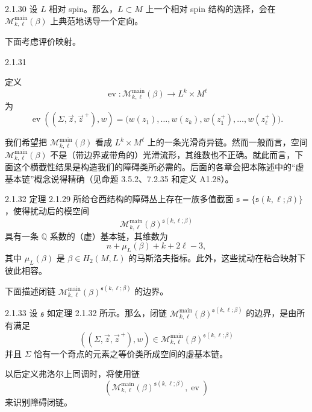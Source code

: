 \begin{theorem}{2.1.30}\label{thm:2-1-30}
设 $L$ 相对 spin。那么，$L\subset M$ 上一个相对 spin 结构的选择，会在
$\mathcal M_{k,\ell}^{\mathrm{main}}(\beta)$ 上典范地诱导一个定向。
\end{theorem}

下面考虑评价映射。

\begin{definition}{2.1.31}\label{def:2-1-31}
\begin{samepage}
定义
\[
  \operatorname{ev}:\mathcal M_{k,\ell}^{\mathrm{main}}(\beta)
  \longrightarrow L^k\times M^\ell
\]
为
\[
  \operatorname{ev}((\Sigma,\vec z,\vec z^{\,+}),w)
  =\bigl(w(z_1),\ldots,w(z_k),
    w(z_1^+),\ldots,w(z_\ell^+)\bigr).
\]
\end{samepage}
\end{definition}

我们希望把 $\mathcal M_{k,\ell}^{\mathrm{main}}(\beta)$ 看成
$L^k\times M^\ell$ 上的一条光滑奇异链。然而一般而言，空间
$\mathcal M_{k,\ell}^{\mathrm{main}}(\beta)$ 不是（带边界或带角的）光滑流形，其维数也不正确。就此而言，下面这个横截性结果是构造我们的障碍类所必需的。后面的各章会把本陈述中的“虚基本链”概念说得精确（见命题 3.5.2、7.2.35 和定义 A1.28）。

\begin{theorem}{2.1.32}\label{thm:2-1-32}
定理 2.1.29 所给仓西结构的障碍丛上存在一族多值截面
$\mathfrak s=\{\mathfrak s(k,\ell;\beta)\}$，使得扰动后的模空间
\[
  \mathcal M_{k,\ell}^{\mathrm{main}}(\beta)
    ^{\mathfrak s(k,\ell;\beta)}
\]
具有一条 $\mathbb Q$ 系数的（虚）基本链，其维数为
\[
  n+\mu_L(\beta)+k+2\ell-3,
\]
其中 $\mu_L(\beta)$ 是
$\beta\in H_2(M,L)$ 的马斯洛夫指标。此外，这些扰动在粘合映射下彼此相容。
\end{theorem}

下面描述闭链
$\mathcal M_{k,\ell}^{\mathrm{main}}(\beta)
 ^{\mathfrak s(k,\ell;\beta)}$ 的边界。

\begin{theorem}{2.1.33}\label{thm:2-1-33}
设 $\mathfrak s$ 如定理 2.1.32 所示。那么，闭链
$\mathcal M_{k,\ell}^{\mathrm{main}}(\beta)
 ^{\mathfrak s(k,\ell;\beta)}$ 的边界，是由所有满足
\[
  ((\Sigma,\vec z,\vec z^{\,+}),w)
  \in
  \mathcal M_{k,\ell}^{\mathrm{main}}(\beta)
    ^{\mathfrak s(k,\ell;\beta)}
\]
并且 $\Sigma$ 恰有一个奇点的元素之等价类所成空间的虚基本链。
\end{theorem}

以后定义弗洛尔上同调时，将使用链
\[
  \left(
    \mathcal M_{k,\ell}^{\mathrm{main}}(\beta)
      ^{\mathfrak s(k,\ell;\beta)},
    \operatorname{ev}
  \right)
\]
来识别障碍闭链。
